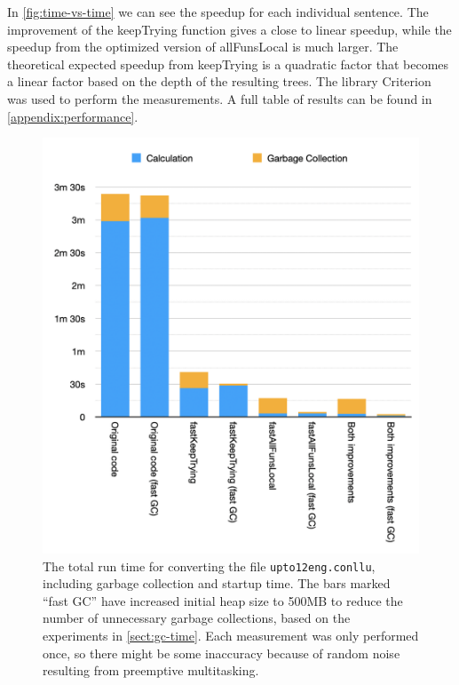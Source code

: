 In \autoref{fig:time-vs-time} we can see the speedup for each individual sentence. The improvement of the keepTrying function gives a close to linear speedup, while the speedup from the optimized version of allFunsLocal is much larger. The theoretical expected speedup from keepTrying is a quadratic factor that becomes a linear factor based on the depth of the resulting trees. The library Criterion\protect\footnotemark{} was used to perform the measurements. A full table of results can be found in \autoref{appendix:performance}.
\begin{figure}
    \centering
    \includegraphics[scale=0.75]{figure/Time-including-GC.png}
    \caption[The total run time for converting the file \texttt{upto12eng.conllu}, including garbage collection and startup time.]{The total run time for converting the file \texttt{upto12eng.conllu}, including garbage collection and startup time. The bars marked ``fast GC'' have increased initial heap size to 500MB to reduce the number of unnecessary garbage collections, based on the experiments in \autoref{sect:gc-time}. Each measurement was only performed once, so there might be some inaccuracy because of random noise resulting from preemptive multitasking.}
    \label{fig:time-including-gc}
\end{figure}

